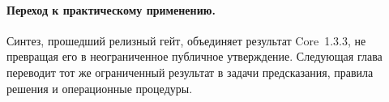 \begingroup
\small

\endgroup

\paragraph{Переход к практическому применению.}
Синтез, прошедший релизный гейт, объединяет результат Core~1.3.3, не
превращая его в неограниченное публичное утверждение. Следующая глава
переводит тот же ограниченный результат в задачи предсказания, правила
решения и операционные процедуры.
